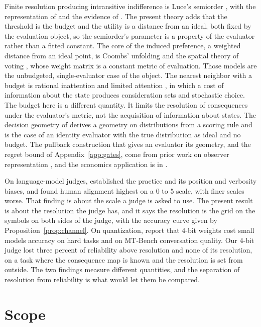 \documentclass{article}
\theoremstyle{definition}
\theoremstyle{remark}
\begin{document}
Finite resolution producing intransitive indifference is Luce's semiorder \citep{luce1956}, with the representation of \citet{scott1958} and the evidence of \citet{tversky1969}.
The present theory adds that the threshold is the budget and the utility is a distance from an ideal, both fixed by the evaluation object, so the semiorder's parameter is a property of the evaluator rather than a fitted constant.
The core of the induced preference, a weighted distance from an ideal point, is Coombs' unfolding \citep{coombs1964} and the spatial theory of voting \citep{davis1970,enelow1984}, whose weight matrix is a constant metric of evaluation.
Those models are the unbudgeted, single-evaluator case of the object.
The nearest neighbor with a budget is rational inattention and limited attention \citep{sims2003,caplin2015,masatlioglu2012,matejka2015}, in which a cost of information about the state produces consideration sets and stochastic choice.
The budget here is a different quantity.
It limits the resolution of consequences under the evaluator's metric, not the acquisition of information about states.
The decision geometry of \citet{dawid2007} derives a geometry on distributions from a scoring rule and is the case of an identity evaluator with the true distribution as ideal and no budget.
The pullback construction that gives an evaluator its geometry, and the regret bound of Appendix~\ref{app:gates}, come from prior work on observer representation \citep{bond2026or}, and the economics application is in \citet{bond2026tcss}.

On language-model judges, \citet{zheng2023} established the practice and its position and verbosity biases, and \citet{li2026grading} found human alignment highest on a 0 to 5 scale, with finer scales worse.
That finding is about the scale a judge is asked to use.
The present result is about the resolution the judge has, and it says the resolution is the grid on the symbols on both sides of the judge, with the accuracy curve given by Proposition~\ref{prop:channel}.
On quantization, \citet{lee2025quant} report that 4-bit weights cost small models accuracy on hard tasks and on MT-Bench conversation quality.
Our 4-bit judge lost three percent of reliability above resolution and none of its resolution, on a task where the consequence map is known and the resolution is set from outside.
The two findings measure different quantities, and the separation of resolution from reliability is what would let them be compared.

\section{Scope}
\label{sec:scope}
\end{document}
